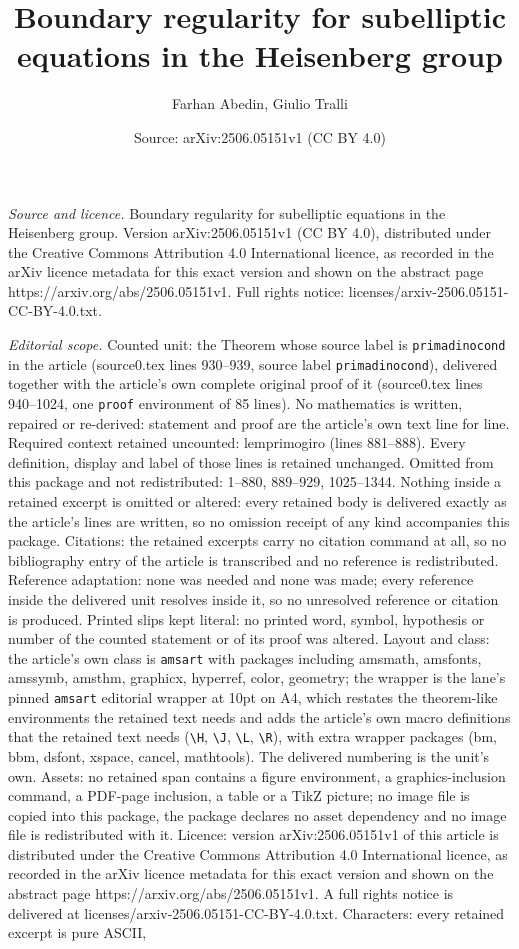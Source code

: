 \documentclass[10pt,a4paper]{amsart}
\title[Boundary regularity for subelliptic equations in the Heisenb]{Boundary regularity for subelliptic equations in the Heisenberg group}
\author{Farhan Abedin, Giulio Tralli}
\date{Source: arXiv:2506.05151v1 (CC BY 4.0)}
\begin{document}
\maketitle

\noindent\emph{Source and licence.} Boundary regularity for subelliptic equations in the Heisenberg group. Version arXiv:2506.05151v1 (CC BY 4.0), distributed under the Creative Commons Attribution 4.0 International licence, as recorded in the arXiv licence metadata for this exact version and shown on the abstract page https://arxiv.org/abs/2506.05151v1. Full rights notice: licenses/arxiv-2506.05151-CC-BY-4.0.txt.\par\smallskip

\noindent\textit{Editorial scope.} Counted unit: the Theorem whose source label is \texttt{primadinocond} in the article (source0.tex lines 930--939, source label \texttt{primadinocond}), delivered together with the article's own complete original proof of it (source0.tex lines 940--1024, one \texttt{proof} environment of 85 lines). No mathematics is written, repaired or re-derived: statement and proof are the article's own text line for line. Required context retained uncounted: lemprimogiro (lines 881--888). Every definition, display and label of those lines is retained unchanged. Omitted from this package and not redistributed: 1--880, 889--929, 1025--1344. Nothing inside a retained excerpt is omitted or altered: every retained body is delivered exactly as the article's lines are written, so no omission receipt of any kind accompanies this package. Citations: the retained excerpts carry no citation command at all, so no bibliography entry of the article is transcribed and no reference is redistributed. Reference adaptation: none was needed and none was made; every reference inside the delivered unit resolves inside it, so no unresolved reference or citation is produced. Printed slips kept literal: no printed word, symbol, hypothesis or number of the counted statement or of its proof was altered. Layout and class: the article's own class is \texttt{amsart} with packages including amsmath, amsfonts, amssymb, amsthm, graphicx, hyperref, color, geometry; the wrapper is the lane's pinned \texttt{amsart} editorial wrapper at 10pt on A4, which restates the theorem-like environments the retained text needs and adds the article's own macro definitions that the retained text needs (\texttt{\textbackslash H}, \texttt{\textbackslash J}, \texttt{\textbackslash L}, \texttt{\textbackslash R}), with extra wrapper packages (bm, bbm, dsfont, xspace, cancel, mathtools). The delivered numbering is the unit's own. Assets: no retained span contains a figure environment, a graphics-inclusion command, a PDF-page inclusion, a table or a TikZ picture; no image file is copied into this package, the package declares no asset dependency and no image file is redistributed with it. Licence: version arXiv:2506.05151v1 of this article is distributed under the Creative Commons Attribution 4.0 International licence, as recorded in the arXiv licence metadata for this exact version and shown on the abstract page https://arxiv.org/abs/2506.05151v1. A full rights notice is delivered at licenses/arxiv-2506.05151-CC-BY-4.0.txt. Characters: every retained excerpt is pure ASCII, 
\end{document}
